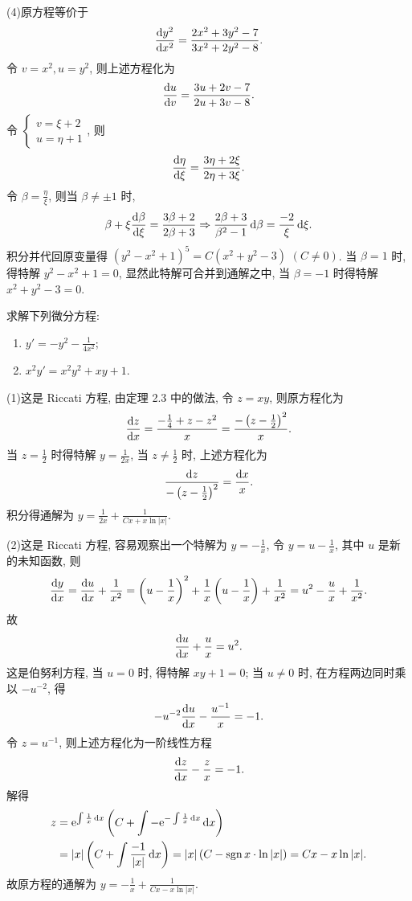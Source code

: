 \begin{solution}
  (4)原方程等价于
  \[\frac{\mathop{}\!\mathrm{d} y^2}{\mathop{}\!\mathrm{d} x^2}=\frac{2x^2+3y^2-7}{3x^2+2y^2-8}.\]
  令 $v=x^2,u=y^2$, 则上述方程化为
  \[\frac{\mathop{}\!\mathrm{d} u}{\mathop{}\!\mathrm{d} v}=\frac{3u+2v-7}{2u+3v-8}.\]
  令 $\begin{cases}v=\xi+2\\u=\eta+1\end{cases}$, 则
  \[\frac{\mathop{}\!\mathrm{d}\eta}{\mathop{}\!\mathrm{d}\xi}=\frac{3\eta+2\xi}{2\eta+3\xi}.\]
  令 $\beta=\frac{\eta}{\xi}$, 则当 $\beta\neq\pm 1$ 时,
  \[\beta+\xi\frac{\mathop{}\!\mathrm{d}\beta}{\mathop{}\!\mathrm{d}\xi} = \frac{3\beta+2}{2\beta+3}
    \Rightarrow\frac{2\beta+3}{\beta^2-1}\mathop{}\!\mathrm{d}\beta=\frac{-2}{\xi}\mathop{}\!\mathrm{d}\xi.\]
  积分并代回原变量得 $(y^2-x^2+1)^5=C(x^2+y^2-3)$ $(C\neq 0)$.
  当 $\beta=1$ 时, 得特解 $y^2-x^2+1=0$, 显然此特解可合并到通解之中, 当 $\beta=-1$ 时得特解 $x^2+y^2-3=0$.
\end{solution}



\begin{exercise}
  求解下列微分方程:
  \begin{enumerate}[(1)]
  \item $\displaystyle y'=-y^2-\frac{1}{4x^2}$;
  \item $\displaystyle x^2y'=x^2y^2+xy+1$.
  \end{enumerate}
\end{exercise}

\begin{solution}
  (1)这是 Riccati 方程, 由定理 2.3 中的做法, 令 $z=xy$, 则原方程化为
  \[\frac{\mathop{}\!\mathrm{d} z}{\mathop{}\!\mathrm{d} x}=\frac{-\frac{1}{4}+z-z^2}{x}=\frac{-\left(z-\frac{1}{2}\right)^2}{x}.\]
  当 $z=\frac{1}{2}$ 时得特解 $y=\frac{1}{2x}$, 当 $z\neq\frac{1}{2}$ 时, 上述方程化为
  \[\frac{\mathop{}\!\mathrm{d} z}{-\left(z-\frac{1}{2}\right)^2}=\frac{\mathop{}\!\mathrm{d} x}{x}.\]
  积分得通解为 $y=\frac{1}{2x}+\frac{1}{Cx+x\ln|x|}$.

  (2)这是 Riccati 方程, 容易观察出一个特解为 $y=-\frac{1}{x}$,
  令 $y=u-\frac{1}{x}$, 其中 $u$ 是新的未知函数, 则
  \[\frac{\mathop{}\!\mathrm{d} y}{\mathop{}\!\mathrm{d} x}=\frac{\mathop{}\!\mathrm{d} u}{\mathop{}\!\mathrm{d} x}+\frac{1}{x^2}
    = \left(u-\frac{1}{x}\right)^2+\frac{1}{x}\left(u-\frac{1}{x}\right)+\frac{1}{x^2}
    = u^2-\frac{u}{x}+\frac{1}{x^2}.\]
  故
  \[\frac{\mathop{}\!\mathrm{d} u}{\mathop{}\!\mathrm{d} x}+\frac{u}{x} = u^2.\]
  这是伯努利方程, 当 $u=0$ 时, 得特解 $xy+1=0$; 当 $u\neq 0$ 时, 在方程两边同时乘以 $-u^{-2}$, 得
  \[-u^{-2}\frac{\mathop{}\!\mathrm{d} u}{\mathop{}\!\mathrm{d} x}-\frac{u^{-1}}{x}=-1.\]
  令 $z=u^{-1}$, 则上述方程化为一阶线性方程
  \[\frac{\mathop{}\!\mathrm{d} z}{\mathop{}\!\mathrm{d} x}-\frac{z}{x} = -1.\]
  解得
  \begin{align*}
    z & = \mathrm{e}^{\int\frac{1}{x}\mathop{}\!\mathrm{d} x}\left(C+\int-\mathrm{e}^{-\int\frac{1}{x}\mathop{}\!\mathrm{d} x}\mathop{}\!\mathrm{d} x\right)\\
      & = |x|\left(C+\int\frac{-1}{|x|}\mathop{}\!\mathrm{d} x\right)=|x|\left(C-\operatorname{sgn} x\cdot\ln|x|\right)=Cx-x\ln|x|.
  \end{align*}
  故原方程的通解为 $y=-\frac{1}{x}+\frac{1}{Cx-x\ln|x|}$.
\end{solution}



